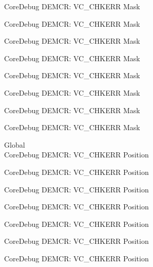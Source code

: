 \begin{DoxyRefList}
\label{deprecated__deprecated000515}%
%
Core\+Debug DEMCR\+: VC\+\_\+\+CHKERR Mask 

\label{deprecated__deprecated000617}%
%
Core\+Debug DEMCR\+: VC\+\_\+\+CHKERR Mask 

\label{deprecated__deprecated000742}%
%
Core\+Debug DEMCR\+: VC\+\_\+\+CHKERR Mask 

\label{deprecated__deprecated000886}%
%
Core\+Debug DEMCR\+: VC\+\_\+\+CHKERR Mask 

\label{deprecated__deprecated001028}%
%
Core\+Debug DEMCR\+: VC\+\_\+\+CHKERR Mask 

\label{deprecated__deprecated001104}%
%
Core\+Debug DEMCR\+: VC\+\_\+\+CHKERR Mask 

\label{deprecated__deprecated001193}%
%
Core\+Debug DEMCR\+: VC\+\_\+\+CHKERR Mask 

\label{deprecated__deprecated001295}%
%
Core\+Debug DEMCR\+: VC\+\_\+\+CHKERR Mask  
\item[Global \doxylink{group___c_m_s_i_s___core_debug_ga10fc7c53bca904c128bc8e1a03072d50}{Core\+Debug\+\_\+\+DEMCR\+\_\+\+VC\+\_\+\+CHKERR\+\_\+\+Pos} ]\hfill \\
\label{deprecated__deprecated000063}%
%
Core\+Debug DEMCR\+: VC\+\_\+\+CHKERR Position 

\label{deprecated__deprecated000207}%
%
Core\+Debug DEMCR\+: VC\+\_\+\+CHKERR Position 

\label{deprecated__deprecated000349}%
%
Core\+Debug DEMCR\+: VC\+\_\+\+CHKERR Position 

\label{deprecated__deprecated000425}%
%
Core\+Debug DEMCR\+: VC\+\_\+\+CHKERR Position 

\label{deprecated__deprecated000514}%
%
Core\+Debug DEMCR\+: VC\+\_\+\+CHKERR Position 

\label{deprecated__deprecated000616}%
%
Core\+Debug DEMCR\+: VC\+\_\+\+CHKERR Position 

\label{deprecated__deprecated000741}%
%
Core\+Debug DEMCR\+: VC\+\_\+\+CHKERR Position 


\end{DoxyRefList}
